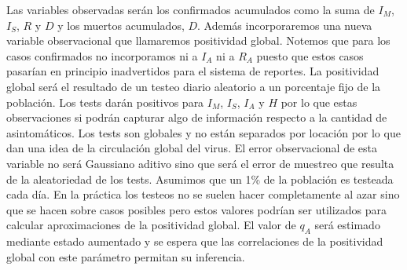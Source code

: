 Las variables observadas serán los confirmados acumulados como la suma de $I_M$, $I_S$, $R$ y $D$ y los muertos acumulados, $D$. Además incorporaremos una nueva variable observacional que llamaremos positividad global. Notemos que para los casos confirmados no incorporamos ni a $I_A$ ni a $R_A$ puesto que estos casos pasarían en principio inadvertidos para el sistema de reportes. La positividad global será el resultado de un testeo diario aleatorio a un porcentaje fijo de la población. Los tests darán positivos para $I_M$, $I_S$, $I_A$ y $H$ por lo que estas observaciones si podrán capturar algo de información respecto a la cantidad de asintomáticos. Los tests son globales y no están separados por locación por lo que dan una idea de la circulación global del virus. El error observacional de esta variable no será Gaussiano aditivo sino que será el error de muestreo que resulta de la aleatoriedad de los tests. Asumimos que un 1\% de la población es testeada cada día. En la práctica los testeos no se suelen hacer completamente al azar sino que se hacen sobre casos posibles pero estos valores podrían ser utilizados para calcular aproximaciones de la positividad global. El valor de $q_A$ será estimado mediante estado aumentado y se espera que las correlaciones de la positividad global con este parámetro permitan su inferencia.

